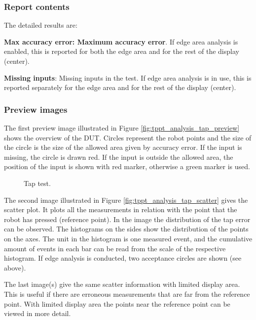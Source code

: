 \subsubsection{Report contents}

The detailed results are:

\textbf{Max accuracy error: Maximum accuracy error}. If edge area analysis is enabled, this is reported for both the edge area and for the rest of the display (center).

\textbf{Missing inputs}: Missing inputs in the test. If edge area analysis is in use, this is reported separately for the edge area and for the rest of the display (center).

\subsubsection{Preview images}

The first preview image illustrated in Figure \ref{fig:tppt_analysis_tap_preview} shows the overview of the DUT. Circles represent the robot points and the size of the circle is the size of the allowed area given by accuracy error. If the input is missing, the circle is drawn red. If the input is outside the allowed area, the position of the input is shown with red marker, otherwise a green marker is used.

\begin{figure}[!h]
	\caption{Tap test.}
\end{figure}

The second image illustrated in Figure \ref{fig:tppt_analysis_tap_scatter} gives the scatter plot. It plots all the measurements in relation with the point that the robot has pressed (reference point). In the image the distribution of the tap error can be observed. The histograms on the sides show the distribution of the points on the axes. The unit in the histogram is one measured event, and the cumulative amount of events in each bar can be read from the scale of the respective histogram. If edge analysis is conducted, two acceptance circles are shown (see above).

The last image(s) give the same scatter information with limited display area. This is useful if there are erroneous measurements that are far from the reference point. With limited display area the points near the reference point can be viewed in more detail.

